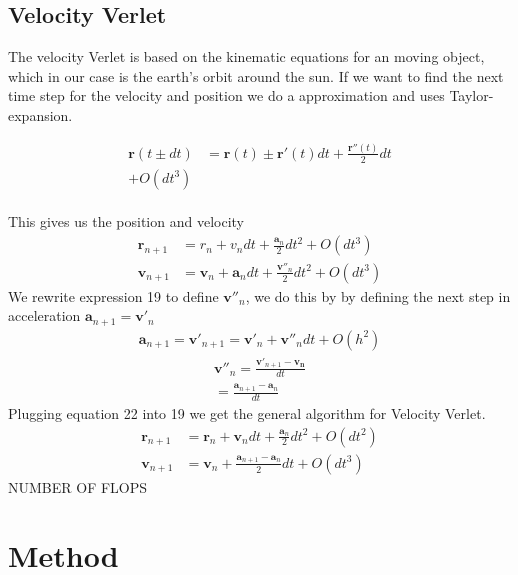 \documentclass{article}
\begin{document}
\begin{multicols}{2}
\subsection{Velocity Verlet}

The velocity Verlet is based on the kinematic equations for an moving object, which in our case is the earth's orbit around the sun. If we want to find the next time step for the velocity and position we do a approximation and uses Taylor-expansion.    

\begin{align}
\mathbf{r}(t\pm dt)&=\mathbf{r}(t)\pm \mathbf{r}'(t)dt + \frac{\mathbf{r}''(t)}{2}dt\\ + O(dt^3)
\end{align}\\
This gives us the position and velocity 
\begin{align}
    \mathbf{r}_{n+1}&=r_n+v_ndt + \frac{\mathbf{a}_n}{2}dt^2+O(dt^3)\\
    \mathbf{v}_{n+1}&=\mathbf{v}_n+\mathbf{a}_ndt+\frac{\mathbf{v}''_n}{2}dt^2 + O(dt^3)
\end{align}
We rewrite expression 19 to define $\mathbf{v}''_n$, we do this by by defining the next step in acceleration $\mathbf{a}_{n+1}=\mathbf{v}'_n$ 
\begin{align}
    \mathbf{a}_{n+1}=\mathbf{v}'_{n+1}=\mathbf{v}'_n+\mathbf{v}''_ndt + O(h^2)
\end{align}
\begin{align}
        \mathbf{v}''_n=\frac{\mathbf{v}'_{n+1}-\mathbf{v_n}}{dt}\\
    =\frac{\mathbf{a}_{n+1}-\mathbf{a}_n}{dt}
\end{align}
Plugging equation 22 into 19 we get the general algorithm for Velocity Verlet. 
\begin{align}
    \mathbf{r}_{n+1}&=\mathbf{r}_n+\mathbf{v}_ndt+\frac{\mathbf{a}_n}{2}dt^2+O(dt^2)\\
    \mathbf{v}_{n+1}&=\mathbf{v}_n+\frac{\mathbf{a}_{n+1}-\mathbf{a}_n}{2}dt+O(dt^3)
\end{align}
NUMBER OF FLOPS
\\
\section{Method}

\end{multicols}
\end{document}
